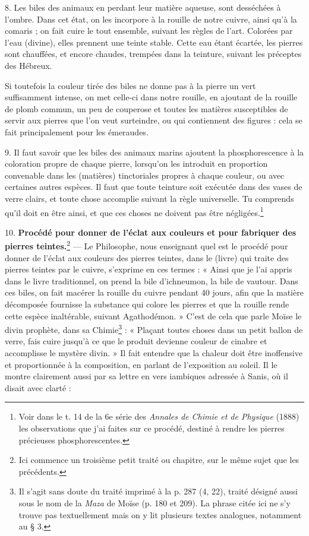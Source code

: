 \documentclass[a4paper, 11pt, oneside, polutonikogreek, french]{article}
\begin{document}
8. Les biles des animaux en perdant leur matière aqueuse, sont desséchées à l'ombre. Dans cet état, on les incorpore à la rouille de notre cuivre, ainsi qu'à la comaris ; on fait cuire le tout ensemble, suivant les règles de l'art. Colorées par l'eau (divine), elles prennent une teinte stable. Cette eau étant écartée, les pierres sont chauffées, et encore chaudes, trempées dans la teinture, suivant les préceptes des Hébreux.

Si toutefois la couleur tirée des biles ne donne pas à la pierre un vert suffisamment intense, on met celle-ci dans notre rouille, en ajoutant de la rouille de plomb commun, un peu de couperose et toutes les matières susceptibles de servir aux pierres que l'on veut surteindre, ou qui contiennent des figures : cela se fait principalement pour les émeraudes.

9. Il faut savoir que les biles des animaux marins ajoutent la phosphorescence à la coloration propre de chaque pierre, lorsqu'on les introduit en proportion convenable dans les (matières) tinctoriales propres à chaque couleur, ou avec certaines autres espèces. Il faut que toute teinture soit exécutée dans des vases de verre clairs, et toute chose accomplie suivant la règle universelle. Tu comprends qu'il doit en être ainsi, et que ces choses ne doivent pas être négligées.\footnote{Voir dans le t. 14 de la 6e série des \emph{Annales de Chimie et de Physique} (1888) les observations que j'ai faites sur ce procédé, destiné à rendre les pierres précieuses phosphorescentes.}

10. \textbf{Procédé pour donner de l'éclat aux couleurs et pour fabriquer des pierres teintes.}\footnote{Ici commence un troisième petit traité ou chapitre, sur le même sujet que les précédents.} --- Le Philosophe, nous enseignant quel est le procédé pour donner de l'éclat aux couleurs des pierres teintes, dans le (livre) qui traite des pierres teintes par le cuivre, s'exprime en ces termes : « Ainsi que je l'ai appris dans le livre traditionnel, on prend la bile d'ichneumon, la bile de vautour. Dans ces biles, on fait macérer la rouille du cuivre pendant 40 jours, afin que la matière décomposée fournisse la substance qui colore les pierres et que la rouille rende cette espèce inaltérable, suivant Agathodémon. » C'est de cela que parle Moïse le divin prophète, dans sa Chimie\footnote{Il s'agit sans doute du traité imprimé à la p. 287 (4, 22), traité désigné aussi sous le nom de la \emph{Maza} de Moïse (p. 180 et 209). La phrase citée ici ne s'y trouve pas textuellement mais on y lit plusieurs textes analogues, notamment au § 3.} : « Plaçant toutes choses dans un petit ballon de verre, fais cuire jusqu'à ce que le produit devienne couleur de cinabre et accomplisse le mystère divin. » Il fait entendre que la chaleur doit être inoffensive et proportionnée à la composition, en parlant de l'exposition au soleil. Il le montre clairement aussi par sa lettre en vers iambiques adressée à Sanis, où il disait avec clarté :
\end{document}
